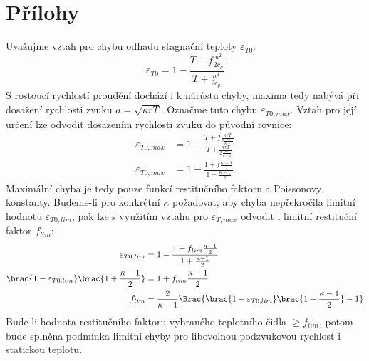 \section*{Přílohy}
    Uvažujme vztah pro chybu odhadu stagnační teploty $\varepsilon _{T0}$:
    \begin{equation*}
        \varepsilon _{T0} = 1 - \frac{T + f \frac{u^2}{2 c_p}}{T + \frac{u^2}{2 c_p}}
    \end{equation*}
    \noindent S rostoucí rychlostí proudění dochází i k nárůstu chyby, maxima tedy nabývá při dosažení rychlosti zvuku $a = \sqrt{\kappa r T}$. Označme tuto chybu $\varepsilon _{T0,max}$. Vztah pro její určení lze odvodit dosazením rychlosti zvuku do původní rovnice:
    \begin{align*}
        \varepsilon _{T0,max} &= 1 - \frac{T + f \frac{\kappa r T}{2 \frac{\kappa r}{\kappa - 1}}}{T + \frac{\kappa r T}{2 \frac{\kappa r}{\kappa - 1}}} \\
        \varepsilon _{T0,max} &= 1 - \frac{1 + f \frac{\kappa - 1}{2}}{1 + \frac{\kappa - 1}{2}}
    \end{align*}
    \noindent Maximální chyba je tedy pouze funkcí restitučního faktoru a Poissonovy konstanty. Budeme-li pro konkrétní $\kappa$ požadovat, aby chyba nepřekročila limitní hodnotu $\varepsilon _{T0,lim}$, pak lze s využitím vztahu pro $\varepsilon _{T,max}$ odvodit i limitní restituční faktor $f_{lim}$:
    \begin{align*}
        \varepsilon _{T0,lim} &= 1 - \frac{1 + f_{lim} \frac{\kappa - 1}{2}}{1 + \frac{\kappa - 1}{2}} \\
        \brac{1 - \varepsilon _{T0,lim}} \brac{1 + \frac{\kappa - 1}{2}} &= 1 + f_{lim} \frac{\kappa - 1}{2} \\
        f_{lim} &= \frac{2}{\kappa - 1} \Brac{\brac{1 - \varepsilon _{T0,lim}} \brac{1 + \frac{\kappa - 1}{2}} - 1}
    \end{align*}
    \noindent Bude-li hodnota restitučního faktoru vybraného teplotního čidla $\geq f_{lim}$, potom bude splněna podmínka limitní chyby pro libovolnou podzvukovou rychlost i statickou teplotu.
    \newpage


